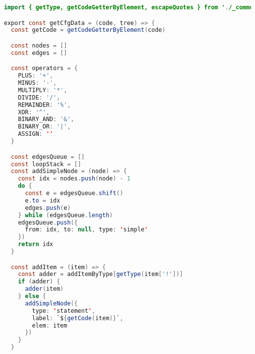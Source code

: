\begin{lstlisting}[language=Java,
caption={cfg.js}]
import { getType, getCodeGetterByElement, escapeQuotes } from './_common'

export const getCfgData = (code, tree) => {
  const getCode = getCodeGetterByElement(code)

  const nodes = []
  const edges = []

  const operators = {
    PLUS: '+',
    MINUS: '-',
    MULTIPLY: '*',
    DIVIDE: '/',
    REMAINDER: '%',
    XOR: '^',
    BINARY_AND: '&',
    BINARY_OR: '|',
    ASSIGN: ''
  }

  const edgesQueue = []
  const loopStack = []
  const addSimpleNode = (node) => {
    const idx = nodes.push(node) - 1
    do {
      const e = edgesQueue.shift()
      e.to = idx
      edges.push(e)
    } while (edgesQueue.length)
    edgesQueue.push({
      from: idx, to: null, type: 'simple'
    })
    return idx
  }

  const addItem = (item) => {
    const adder = addItemByType[getType(item['!'])]
    if (adder) {
      adder(item)
    } else {
      addSimpleNode({
        type: 'statement',
        label: `${getCode(item)}`,
        elem: item
      })
    }
  }


\end{lstlisting}
